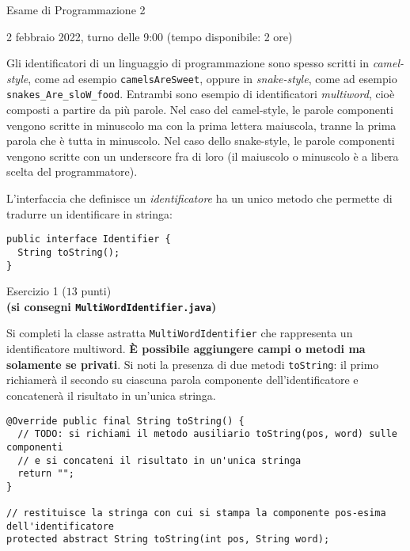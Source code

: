 \documentclass[12pt]{article}
\begin{document}
\begin{center}{\LARGE Esame di Programmazione 2}\\
\begin{center}
  \large 2 febbraio 2022, turno delle 9:00 (tempo disponibile: 2 ore)
\end{center}
\end{center}

Gli identificatori di un linguaggio di programmazione sono spesso scritti
in \emph{camel-style}, come ad esempio \texttt{camelsAreSweet}, oppure in
\emph{snake-style}, come ad esempio \texttt{snakes\_Are\_sloW\_food}.
Entrambi sono esempio di identificatori \emph{multiword}, cio\`e composti
a partire da pi\`u parole. Nel caso del camel-style, le parole componenti
vengono scritte
in minuscolo ma con la prima lettera maiuscola, tranne la prima parola che \`e
tutta in minuscolo. Nel caso dello snake-style, le parole componenti vengono scritte
con un underscore fra di loro (il maiuscolo o minuscolo \`e a libera
scelta del programmatore).

L'interfaccia che definisce un \emph{identificatore} ha un unico metodo che
permette di tradurre un identificare in stringa:

{\small\begin{verbatim}
public interface Identifier {
  String toString();
}
\end{verbatim}}

\vspace*{1ex}
\begin{center}{\Large Esercizio 1} ($13$ punti)\\
  \textbf{(si consegni \texttt{MultiWordIdentifier.java})}
\end{center}

Si completi la classe astratta \texttt{MultiWordIdentifier} che rappresenta
un identificatore multiword.
\textbf{\`E possibile aggiungere campi o metodi ma solamente se privati}.
Si noti la presenza di due metodi \texttt{toString}:
il primo richiamer\`a il secondo su ciascuna parola componente dell'identificatore
e concatener\`a il risultato in un'unica stringa.

{\small\begin{verbatim}
@Override public final String toString() {
  // TODO: si richiami il metodo ausiliario toString(pos, word) sulle componenti
  // e si concateni il risultato in un'unica stringa
  return "";
}

// restituisce la stringa con cui si stampa la componente pos-esima dell'identificatore
protected abstract String toString(int pos, String word);
\end{verbatim}}
\end{document}
